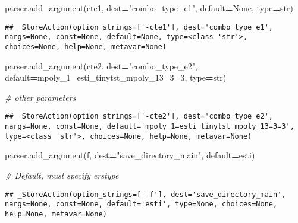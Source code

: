 \documentclass[
]{book}
\newenvironment{Shaded}{\begin{snugshade}}{\end{snugshade}}
\newcommand{\BuiltInTok}[1]{#1}
\newcommand{\CommentTok}[1]{\textcolor[rgb]{0.56,0.35,0.01}{\textit{#1}}}
\newcommand{\NormalTok}[1]{#1}
\newcommand{\OperatorTok}[1]{\textcolor[rgb]{0.81,0.36,0.00}{\textbf{#1}}}
\newcommand{\StringTok}[1]{\textcolor[rgb]{0.31,0.60,0.02}{#1}}
\newcommand{\VariableTok}[1]{\textcolor[rgb]{0.00,0.00,0.00}{#1}}
\begin{document}
\begin{Shaded}
\begin{Highlighting}[]
\NormalTok{parser.add\_argument(}\StringTok{\textquotesingle{}{-}cte1\textquotesingle{}}\NormalTok{, dest}\OperatorTok{=}\StringTok{"combo\_type\_e1"}\NormalTok{, default}\OperatorTok{=}\VariableTok{None}\NormalTok{, }\BuiltInTok{type}\OperatorTok{=}\BuiltInTok{str}\NormalTok{)}
\end{Highlighting}
\end{Shaded}

\begin{verbatim}
## _StoreAction(option_strings=['-cte1'], dest='combo_type_e1', nargs=None, const=None, default=None, type=<class 'str'>, choices=None, help=None, metavar=None)
\end{verbatim}

\begin{Shaded}
\begin{Highlighting}[]
\NormalTok{parser.add\_argument(}\StringTok{\textquotesingle{}{-}cte2\textquotesingle{}}\NormalTok{, dest}\OperatorTok{=}\StringTok{"combo\_type\_e2"}\NormalTok{, default}\OperatorTok{=}\StringTok{\textquotesingle{}mpoly\_1=esti\_tinytst\_mpoly\_13=3=3\textquotesingle{}}\NormalTok{, }\BuiltInTok{type}\OperatorTok{=}\BuiltInTok{str}\NormalTok{)}

\CommentTok{\# other parameters}
\end{Highlighting}
\end{Shaded}

\begin{verbatim}
## _StoreAction(option_strings=['-cte2'], dest='combo_type_e2', nargs=None, const=None, default='mpoly_1=esti_tinytst_mpoly_13=3=3', type=<class 'str'>, choices=None, help=None, metavar=None)
\end{verbatim}

\begin{Shaded}
\begin{Highlighting}[]
\NormalTok{parser.add\_argument(}\StringTok{\textquotesingle{}{-}f\textquotesingle{}}\NormalTok{, dest}\OperatorTok{=}\StringTok{"save\_directory\_main"}\NormalTok{, default}\OperatorTok{=}\StringTok{\textquotesingle{}esti\textquotesingle{}}\NormalTok{)}

\CommentTok{\# Default, must specify erstype}
\end{Highlighting}
\end{Shaded}

\begin{verbatim}
## _StoreAction(option_strings=['-f'], dest='save_directory_main', nargs=None, const=None, default='esti', type=None, choices=None, help=None, metavar=None)
\end{verbatim}
\end{document}
